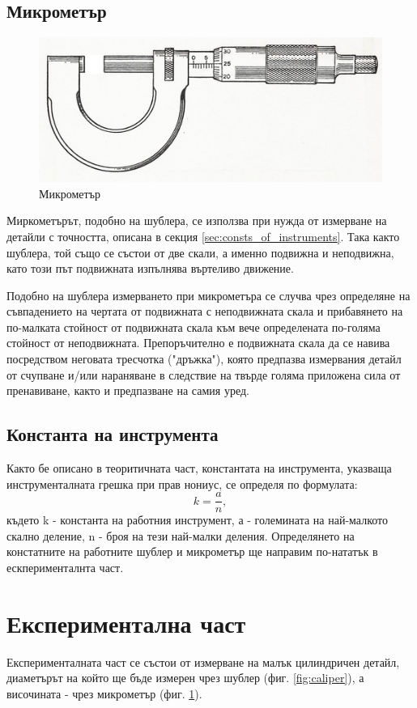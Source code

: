 \documentclass[12pt]{article}
\begin{document}
\subsection{Микрометър}
\begin{figure}
    \centering
    \includegraphics[width=.8\textwidth]{images/micrometers-500x500.jpg}
    \caption{Микрометър}
    \label{fig:micrometer}
\end{figure}

Миркометърът, подобно на шублера, се използва при нужда от измерване на детайли с точността, описана в секция \ref{sec:consts_of_instruments}. Така както шублера, той също се състои от две скали, а именно подвижна и неподвижна, като този път подвижната изпълнява въртеливо движение. 

Подобно на шублера измерването при микрометъра се случва чрез определяне на съвпадението на чертата от подвижната с неподвижната скала и прибавянето на по-малката стойност от подвижната скала към вече определената по-голяма стойност от неподвижната. Препоръчително е подвижната скала да се навива посредством неговата тресчотка ("дръжка"), която предпазва измервания детайл от счупване и/или нараняване в следствие на твърде голяма приложена сила от пренавиване, както и предпазване на самия уред.

\subsection{Константа на инструмента}\label{sec:consts}
Както бе описано в теоритичната част, константата на инструмента, указваща инструменталната грешка при прав нониус, се определя по формулата:
\begin{equation}
k = \frac{a}{n},
\end{equation}\label{eq:meas_consts}
където k - константа на работния инструмент, а - големината на най-малкото скално деление, n - броя на тези най-малки деления. Определянето на констатните на работните шублер и микрометър ще направим по-нататък в ескперименталнта част.

\section{Експериментална част}
Експерименталната част се състои от измерване на малък цилиндричен детайл, диаметърът на който ще бъде измерен чрез шублер (фиг. \ref{fig:caliper}), а височината - чрез микрометър (фиг. \ref{fig:micrometer}).
\end{document}
